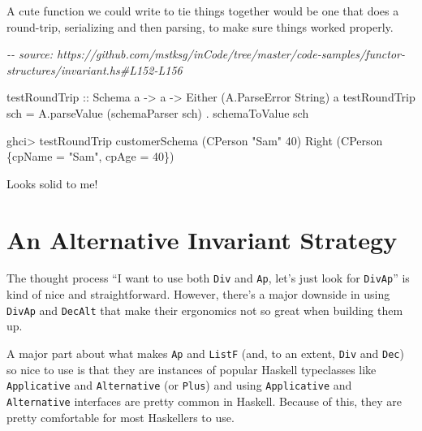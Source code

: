 \documentclass[]{article}
\newenvironment{Shaded}{}{}
\newcommand{\CommentTok}[1]{\textcolor[rgb]{0.38,0.63,0.69}{\textit{#1}}}
\newcommand{\DataTypeTok}[1]{\textcolor[rgb]{0.56,0.13,0.00}{#1}}
\newcommand{\DecValTok}[1]{\textcolor[rgb]{0.25,0.63,0.44}{#1}}
\newcommand{\NormalTok}[1]{#1}
\newcommand{\OperatorTok}[1]{\textcolor[rgb]{0.40,0.40,0.40}{#1}}
\newcommand{\OtherTok}[1]{\textcolor[rgb]{0.00,0.44,0.13}{#1}}
\newcommand{\StringTok}[1]{\textcolor[rgb]{0.25,0.44,0.63}{#1}}
\begin{document}
A cute function we could write to tie things together would be one that does a
round-trip, serializing and then parsing, to make sure things worked properly.

\begin{Shaded}
\begin{Highlighting}[]
\CommentTok{{-}{-} source: https://github.com/mstksg/inCode/tree/master/code{-}samples/functor{-}structures/invariant.hs\#L152{-}L156}

\NormalTok{testRoundTrip}
\OtherTok{    ::} \DataTypeTok{Schema}\NormalTok{ a}
    \OtherTok{{-}\textgreater{}}\NormalTok{ a}
    \OtherTok{{-}\textgreater{}} \DataTypeTok{Either}\NormalTok{ (}\DataTypeTok{A.ParseError} \DataTypeTok{String}\NormalTok{) a}
\NormalTok{testRoundTrip sch }\OtherTok{=}\NormalTok{ A.parseValue (schemaParser sch) }\OperatorTok{.}\NormalTok{ schemaToValue sch}
\end{Highlighting}
\end{Shaded}

\begin{Shaded}
\begin{Highlighting}[]
\NormalTok{ghci}\OperatorTok{\textgreater{}}\NormalTok{ testRoundTrip customerSchema (}\DataTypeTok{CPerson} \StringTok{"Sam"} \DecValTok{40}\NormalTok{)}
\DataTypeTok{Right}\NormalTok{ (}\DataTypeTok{CPerson}\NormalTok{ \{cpName }\OtherTok{=} \StringTok{"Sam"}\NormalTok{, cpAge }\OtherTok{=} \DecValTok{40}\NormalTok{\})}
\end{Highlighting}
\end{Shaded}

Looks solid to me!

\section{An Alternative Invariant
Strategy}\label{an-alternative-invariant-strategy}

The thought process ``I want to use both \texttt{Div} and \texttt{Ap}, let's
just look for \texttt{DivAp}'' is kind of nice and straightforward. However,
there's a major downside in using \texttt{DivAp} and \texttt{DecAlt} that make
their ergonomics not so great when building them up.

A major part about what makes \texttt{Ap} and \texttt{ListF} (and, to an extent,
\texttt{Div} and \texttt{Dec}) so nice to use is that they are instances of
popular Haskell typeclasses like \texttt{Applicative} and \texttt{Alternative}
(or \texttt{Plus}) and using \texttt{Applicative} and \texttt{Alternative}
interfaces are pretty common in Haskell. Because of this, they are pretty
comfortable for most Haskellers to use.
\end{document}
